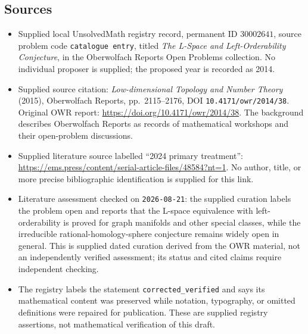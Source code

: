\documentclass[11pt]{article}
\begin{document}
\subsection{Sources}
\begin{itemize}
\item Supplied local UnsolvedMath registry record, permanent ID \(30002641\), source problem code \texttt{catalogue entry}, titled \emph{The L-Space and Left-Orderability Conjecture}, in the Oberwolfach Reports Open Problems collection. No individual proposer is supplied; the proposed year is recorded as 2014.
\item Supplied source citation: \emph{Low-dimensional Topology and Number Theory} (2015), Oberwolfach Reports, pp.\ 2115--2176, DOI \texttt{10.4171/owr/2014/38}. Original OWR report: \url{https://doi.org/10.4171/owr/2014/38}. The background describes Oberwolfach Reports as records of mathematical workshops and their open-problem discussions.
\item Supplied literature source labelled ``2024 primary treatment'': \url{https://ems.press/content/serial-article-files/48584?nt=1}. No author, title, or more precise bibliographic identification is supplied for this link.
\item Literature assessment checked on \texttt{2026-08-21}: the supplied curation labels the problem open and reports that the L-space equivalence with left-orderability is proved for graph manifolds and other special classes, while the irreducible rational-homology-sphere conjecture remains widely open in general. This is supplied dated curation derived from the OWR material, not an independently verified assessment; its status and cited claims require independent checking.
\item The registry labels the statement \texttt{corrected\_verified} and says its mathematical content was preserved while notation, typography, or omitted definitions were repaired for publication. These are supplied registry assertions, not mathematical verification of this draft.
\end{itemize}
\end{document}
